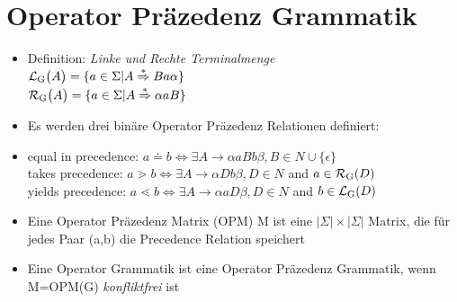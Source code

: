 \documentclass[
10pt,
pantone315, 	%
]{beamer}
\begin{document}
\section{Operator Präzedenz Grammatik}
\begin{frame}[t]{\subsecname}
	\begin{itemize}[<+->]
		\item
		Definition: \textit{Linke und Rechte Terminalmenge}\\
		$\mathcal{L} \textsubscript{G} \big( A \big) = \{ a \in \Sigma | 
		A \overset{*}{\Rightarrow}Ba \alpha \} $\\
		$\mathcal{R} \textsubscript{G} \big( A \big) = \{ a \in \Sigma | 
		A \overset{*}{\Rightarrow} \alpha aB \}$
		\item
		Es werden drei binäre Operator Präzedenz Relationen definiert:
		\item
		equal in precedence: $ a \doteq b \Leftrightarrow \exists A \rightarrow \alpha aBb \beta , 
		B \in N \cup \{ \epsilon \}$ \\
		takes precedence: $ a \gtrdot b \Leftrightarrow \exists A \rightarrow \alpha Db \beta , D \in N $ and $ a \in
		\mathcal{R}\textsubscript{G}(D)$ \\
		yields precedence: $ a \lessdot b \Leftrightarrow \exists A \rightarrow \alpha aD \beta , D \in N $ and $ b \in
		\mathcal{L}\textsubscript{G}(D)$
		\item Eine Operator Präzedenz Matrix (OPM) M ist eine $|\Sigma| \times |\Sigma |$ Matrix, die für jedes Paar (a,b) die Precedence Relation speichert
		\item 
		Eine Operator Grammatik ist eine Operator Präzedenz Grammatik, wenn M=OPM(G) \textit{konfliktfrei} ist
	\end{itemize}
\end{frame}
\end{document}
